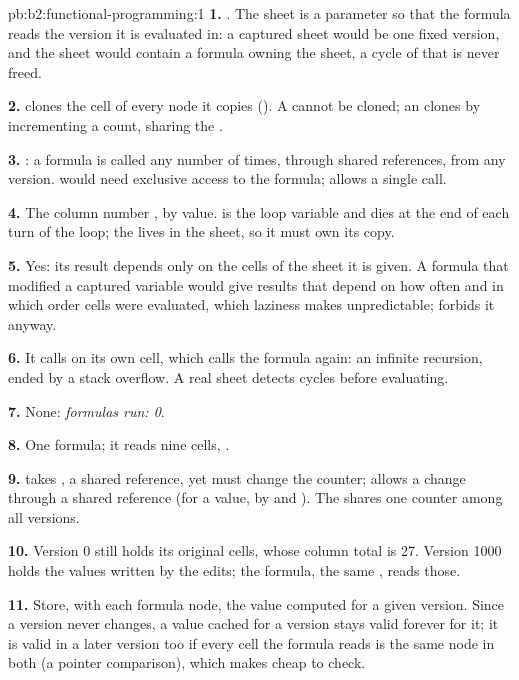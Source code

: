 \begin{solution}{pb:b2:functional-programming:1}
\textbf{1.} . The sheet is a parameter so that the formula reads the version it is
evaluated in: a captured sheet would be one fixed version, and the sheet would contain a formula owning the sheet, a
cycle of  that is never freed.

\textbf{2.}  clones the cell of every node it copies (). A  cannot be
cloned; an  clones by incrementing a count, sharing the .

\textbf{3.} : a formula is called any number of times, through shared references, from any version.
 would need exclusive access to the formula;  allows a single call.

\textbf{4.} The column number , by value.  is the loop variable and dies at the end of each turn of
the loop; the  lives in the sheet, so it must own its copy.

\textbf{5.} Yes: its result depends only on the cells of the sheet it is given. A formula that modified a captured
variable would give results that depend on how often and in which order cells were evaluated, which laziness makes
unpredictable;  forbids it anyway.

\textbf{6.} It calls  on its own cell, which calls the formula again: an infinite recursion, ended by a
stack overflow. A real sheet detects cycles before evaluating.

\textbf{7.} None: \emph{formulas run: 0}.

\textbf{8.} One formula; it reads nine cells, .

\textbf{9.}  takes , a shared reference, yet must change the counter;  allows a
change through a shared reference (for a  value, by  and ). The  shares one
counter among all versions.

\textbf{10.} Version 0 still holds its original cells, whose column total is 27. Version 1000 holds the values written
by the edits; the formula, the same , reads those.

\textbf{11.} Store, with each formula node, the value computed for a given version. Since a version never changes, a
value cached for a version stays valid forever for it; it is valid in a later version too if every cell the formula
reads is the same node in both (a pointer comparison), which  makes cheap to check.


\end{solution}
